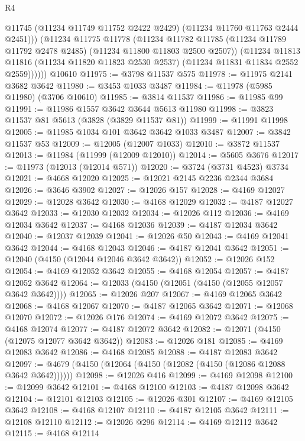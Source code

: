 \begin{lexlean}{R4}
\begin{coremodule}
              @11745
              (@11234 @11749 @11752 @2422 @2429)
              (@11234 @11760 @11763 @2444 @2451)))
          (@11234
            @11775
            @11778
            (@11234
              @11782
              @11785
              (@11234 @11789 @11792 @2478 @2485)
              (@11234 @11800 @11803 @2500 @2507))
            (@11234
              @11813
              @11816
              (@11234 @11820 @11823 @2530 @2537)
              (@11234 @11831 @11834 @2552 @2559))))))
    @10610
@11975 := @3798 @11537 @575
@11978 := @11975 @2141 @3682 @3642
@11980 := @3453 @1033 @3487
@11984 := @11978 (@5985 @11980) (@3706 @10610)
@11985 := @3814 @11537
@11986 := @11985 @99
@11991 := @11986 @1557 @3642 @3644 @5613 @11980
@11998 := @3823 @11537 @81 @5613 (@3828 (@3829 @11537 @81))
@11999 := @11991 @11998
@12005 := @11985 @1034 @101 @3642 @3642 @1033 @3487
@12007 := @3842 @11537 @53
@12009 := @12005 (@12007 @1033)
@12010 := @3872 @11537
@12013 := @11984 (@11999 (@12009 @12010))
@12014 := @5605 @3676
@12017 := @11973 (@12013 (@12014 @571))
@12020 := @3724 (@3731 @4523) @3734
@12021 := @4668 @12020
@12025 := @12021 @2145 @2236 @2344 @3684
@12026 := @3646 @3902
@12027 := @12026 @157
@12028 := @4169 @12027
@12029 := @12028 @3642
@12030 := @4168 @12029
@12032 := @4187 @12027 @3642
@12033 := @12030 @12032
@12034 := @12026 @112
@12036 := @4169 @12034 @3642
@12037 := @4168 @12036
@12039 := @4187 @12034 @3642
@12040 := @12037 @12039
@12041 := @12026 @50
@12043 := @4169 @12041 @3642
@12044 := @4168 @12043
@12046 := @4187 @12041 @3642
@12051 := @12040 (@4150 (@12044 @12046 @3642 @3642))
@12052 := @12026 @152
@12054 := @4169 @12052 @3642
@12055 := @4168 @12054
@12057 := @4187 @12052 @3642
@12064 := @12033 (@4150 (@12051 (@4150 (@12055 @12057 @3642 @3642))))
@12065 := @12026 @207
@12067 := @4169 @12065 @3642
@12068 := @4168 @12067
@12070 := @4187 @12065 @3642
@12071 := @12068 @12070
@12072 := @12026 @176
@12074 := @4169 @12072 @3642
@12075 := @4168 @12074
@12077 := @4187 @12072 @3642
@12082 := @12071 (@4150 (@12075 @12077 @3642 @3642))
@12083 := @12026 @181
@12085 := @4169 @12083 @3642
@12086 := @4168 @12085
@12088 := @4187 @12083 @3642
@12097 := @4679 (@4150 (@12064 (@4150 (@12082 (@4150 (@12086 @12088 @3642 @3642))))))
@12098 := @12026 @416
@12099 := @4169 @12098
@12100 := @12099 @3642
@12101 := @4168 @12100
@12103 := @4187 @12098 @3642
@12104 := @12101 @12103
@12105 := @12026 @301
@12107 := @4169 @12105 @3642
@12108 := @4168 @12107
@12110 := @4187 @12105 @3642
@12111 := @12108 @12110
@12112 := @12026 @296
@12114 := @4169 @12112 @3642
@12115 := @4168 @12114

\end{coremodule}
\end{lexlean}
